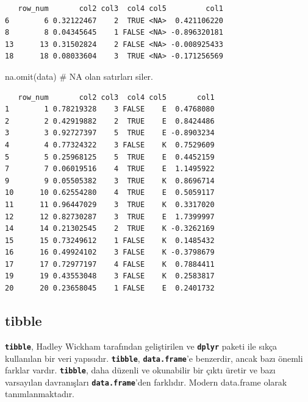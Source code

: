 \documentclass[
  letterpaper,
  DIV=11,
  numbers=noendperiod]{scrreprt}
\newenvironment{Shaded}{\begin{snugshade}}{\end{snugshade}}
\newcommand{\CommentTok}[1]{\textcolor[rgb]{0.37,0.37,0.37}{#1}}
\newcommand{\FunctionTok}[1]{\textcolor[rgb]{0.28,0.35,0.67}{#1}}
\newcommand{\NormalTok}[1]{\textcolor[rgb]{0.00,0.23,0.31}{#1}}
\begin{document}
\begin{verbatim}
   row_num       col2 col3  col4 col5         col1
6        6 0.32122467    2  TRUE <NA>  0.421106220
8        8 0.04345645    1 FALSE <NA> -0.896320181
13      13 0.31502824    2 FALSE <NA> -0.008925433
18      18 0.08033604    3  TRUE <NA> -0.171256569
\end{verbatim}

\begin{Shaded}
\begin{Highlighting}[]
\FunctionTok{na.omit}\NormalTok{(data) }\CommentTok{\# NA olan satırları siler.}
\end{Highlighting}
\end{Shaded}

\begin{verbatim}
   row_num       col2 col3  col4 col5       col1
1        1 0.78219328    3 FALSE    E  0.4768080
2        2 0.42919882    2  TRUE    E  0.8424486
3        3 0.92727397    5  TRUE    E -0.8903234
4        4 0.77324322    3 FALSE    K  0.7529609
5        5 0.25968125    5  TRUE    E  0.4452159
7        7 0.06019516    4  TRUE    E  1.1495922
9        9 0.05505382    3  TRUE    K  0.8696714
10      10 0.62554280    4  TRUE    E  0.5059117
11      11 0.96447029    3  TRUE    K  0.3317020
12      12 0.82730287    3  TRUE    E  1.7399997
14      14 0.21302545    2  TRUE    K -0.3262169
15      15 0.73249612    1 FALSE    K  0.1485432
16      16 0.49924102    3 FALSE    K -0.3798679
17      17 0.72977197    4 FALSE    K  0.7884411
19      19 0.43553048    3 FALSE    K  0.2583817
20      20 0.23658045    1 FALSE    E  0.2401732
\end{verbatim}

\subsection{tibble}\label{tibble}

\textbf{\texttt{tibble}}, Hadley Wickham tarafından geliştirilen ve
\textbf{\texttt{dplyr}} paketi ile sıkça kullanılan bir veri yapısıdır.
\textbf{\texttt{tibble}}, \textbf{\texttt{data.frame}}'e benzerdir,
ancak bazı önemli farklar vardır. \textbf{\texttt{tibble}}, daha düzenli
ve okunabilir bir çıktı üretir ve bazı varsayılan davranışları
\textbf{\texttt{data.frame}}'den farklıdır. Modern data.frame olarak
tanımlanmaktadır.
\end{document}
